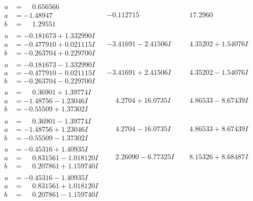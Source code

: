 \documentclass[1p]{elsarticle_modified}
\theoremstyle{definition}
\begin{document}
$$\begin{array}{c|c|c}
\begin{aligned}
u &= \phantom{-}0.656566\phantom{ +0.000000I} \\
a &= -1.48947\phantom{ +0.000000I} \\
b &= \phantom{-}1.29551\phantom{ +0.000000I}\end{aligned}
 & -0.112715\phantom{ +0.000000I} & \phantom{-}17.2960\phantom{ +0.000000I} \\ \hline\begin{aligned}
u &= -0.181673 + 1.332990 I \\
a &= -0.477910 + 0.021115 I \\
b &= -0.263704 + 0.229700 I\end{aligned}
 & -3.41691 - 2.41506 I & \phantom{-}4.35202 + 1.54076 I \\ \hline\begin{aligned}
u &= -0.181673 - 1.332990 I \\
a &= -0.477910 - 0.021115 I \\
b &= -0.263704 - 0.229700 I\end{aligned}
 & -3.41691 + 2.41506 I & \phantom{-}4.35202 - 1.54076 I \\ \hline\begin{aligned}
u &= \phantom{-}0.36901 + 1.39774 I \\
a &= -1.48756 - 1.23046 I \\
b &= -0.55509 + 1.37302 I\end{aligned}
 & \phantom{-}4.2704 + 16.0735 I & \phantom{-}4.86533 - 8.67439 I \\ \hline\begin{aligned}
u &= \phantom{-}0.36901 - 1.39774 I \\
a &= -1.48756 + 1.23046 I \\
b &= -0.55509 - 1.37302 I\end{aligned}
 & \phantom{-}4.2704 - 16.0735 I & \phantom{-}4.86533 + 8.67439 I \\ \hline\begin{aligned}
u &= -0.45316 + 1.40935 I \\
a &= \phantom{-}0.831561 - 1.018120 I \\
b &= \phantom{-}0.207861 + 1.159740 I\end{aligned}
 & \phantom{-}2.26090 - 6.77325 I & \phantom{-}8.15326 + 8.68487 I \\ \hline\begin{aligned}
u &= -0.45316 - 1.40935 I \\
a &= \phantom{-}0.831561 + 1.018120 I \\
b &= \phantom{-}0.207861 - 1.159740 I\end{aligned}

\end{array}$$
\end{document}
